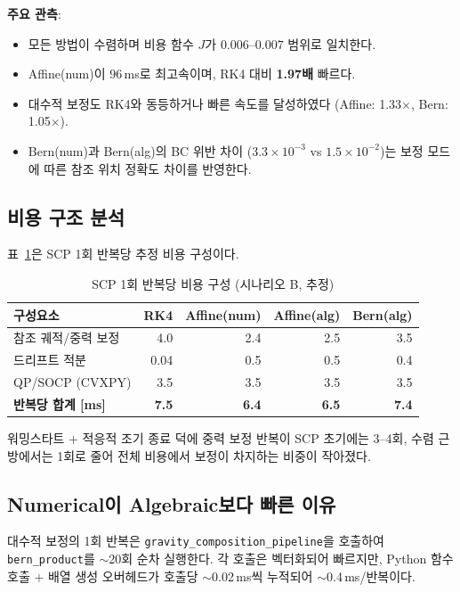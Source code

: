\documentclass[11pt]{article}
\begin{document}
\textbf{주요 관측}:
\begin{itemize}
  \item 모든 방법이 수렴하며 비용 함수 $J$가 $0.006$--$0.007$ 범위로 일치한다.
  \item Affine(num)이 96\,ms로 최고속이며, RK4 대비 \textbf{1.97배} 빠르다.
  \item 대수적 보정도 RK4와 동등하거나 빠른 속도를 달성하였다
        (Affine: 1.33$\times$, Bern: 1.05$\times$).
  \item Bern(num)과 Bern(alg)의 BC 위반 차이
        ($3.3 \!\times\! 10^{-3}$ vs $1.5 \!\times\! 10^{-2}$)는
        보정 모드에 따른 참조 위치 정확도 차이를 반영한다.
\end{itemize}

\subsection{비용 구조 분석}

표~\ref{tab:cost_breakdown}은 SCP 1회 반복당 추정 비용 구성이다.

\begin{table}[h]
\centering
\caption{SCP 1회 반복당 비용 구성 (시나리오 B, 추정)}
\label{tab:cost_breakdown}
\begin{tabular}{lrrrr}
\toprule
구성요소 & RK4 & Affine(num) & Affine(alg) & Bern(alg) \\
\midrule
참조 궤적/중력 보정 & 4.0  & 2.4 & 2.5 & 3.5 \\
드리프트 적분       & 0.04 & 0.5 & 0.5 & 0.4 \\
QP/SOCP (CVXPY)     & 3.5  & 3.5 & 3.5 & 3.5 \\
\midrule
\textbf{반복당 합계 [ms]} & \textbf{7.5} & \textbf{6.4} & \textbf{6.5} & \textbf{7.4} \\
\bottomrule
\end{tabular}
\end{table}

워밍스타트 + 적응적 조기 종료 덕에 중력 보정 반복이
SCP 초기에는 3--4회, 수렴 근방에서는 1회로 줄어
전체 비용에서 보정이 차지하는 비중이 작아졌다.

\subsection{Numerical이 Algebraic보다 빠른 이유}

대수적 보정의 1회 반복은 \texttt{gravity\_composition\_pipeline}을 호출하여
\texttt{bern\_product}를 $\sim$20회 순차 실행한다.
각 호출은 벡터화되어 빠르지만, Python 함수 호출 + 배열 생성 오버헤드가
호출당 $\sim$0.02\,ms씩 누적되어 $\sim$0.4\,ms/반복이다.
\end{document}
